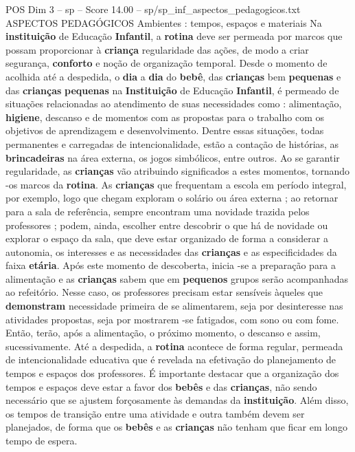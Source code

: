 \begin{textsample}{POS Dim 3 – sp – Score 14.00 – sp/sp\_inf\_aspectos\_pedagogicos.txt}  \label{ex:f3_pos_206}
ASPECTOS PEDAGÓGICOS Ambientes : tempos, espaços e materiais Na \textbf{instituição} de Educação \textbf{Infantil}, a \textbf{rotina} deve ser permeada por marcos que possam proporcionar à \textbf{criança} regularidade das ações, de modo a criar segurança, \textbf{conforto} e noção de organização temporal.
Desde o momento de acolhida até a despedida, o \textbf{dia} a \textbf{dia} do \textbf{bebê}, das \textbf{crianças} bem \textbf{pequenas} e das \textbf{crianças} \textbf{pequenas} na \textbf{Instituição} de Educação \textbf{Infantil}, é permeado de situações relacionadas ao atendimento de suas necessidades como : alimentação, \textbf{higiene}, descanso e de momentos com as propostas para o trabalho com os objetivos de aprendizagem e desenvolvimento.
Dentre essas situações, todas permanentes e carregadas de intencionalidade, estão a contação de histórias, as \textbf{brincadeiras} na área externa, os jogos simbólicos, entre outros.
Ao se garantir regularidade, as \textbf{crianças} vão atribuindo significados a estes momentos, tornando -os marcos da \textbf{rotina}.
As \textbf{crianças} que frequentam a escola em período integral, por exemplo, logo que chegam exploram o solário ou área externa ; ao retornar para a sala de referência, sempre encontram uma novidade trazida pelos professores ; podem, ainda, escolher entre descobrir o que há de novidade ou explorar o espaço da sala, que deve estar organizado de forma a considerar a autonomia, os interesses e as necessidades das \textbf{crianças} e as especificidades da faixa \textbf{etária}.
Após este momento de descoberta, inicia -se a preparação para a alimentação e as \textbf{crianças} sabem que em \textbf{pequenos} grupos serão acompanhadas ao refeitório.
Nesse caso, os professores precisam estar sensíveis àqueles que \textbf{demonstram} necessidade primeira de se alimentarem, seja por desinteresse nas atividades propostas, seja por mostrarem -se fatigados, com sono ou com fome.
Então, terão, após a alimentação, o próximo momento, o descanso e assim, sucessivamente.
Até a despedida, a \textbf{rotina} acontece de forma regular, permeada de intencionalidade educativa que é revelada na efetivação do planejamento de tempos e espaços dos professores.
É importante destacar que a organização dos tempos e espaços deve estar a favor dos \textbf{bebês} e das \textbf{crianças}, não sendo necessário que se ajustem forçosamente às demandas da \textbf{instituição}.
Além disso, os tempos de transição entre uma atividade e outra também devem ser planejados, de forma que os \textbf{bebês} e as \textbf{crianças} não tenham que ficar em longo tempo de espera.

\end{textsample}
